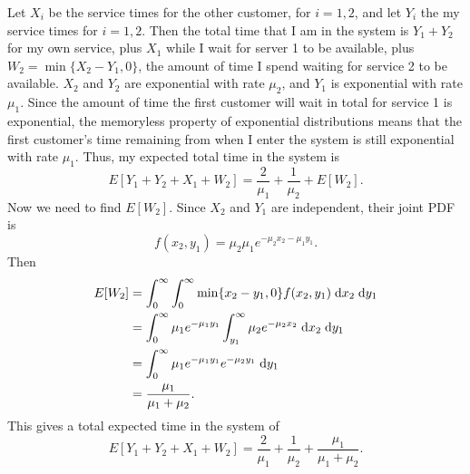 \documentclass{homework}
\begin{document}
	Let $X_i$ be the service times for the other customer, for $i=1,2$, and let $Y_i$ the my service times for $i=1,2$. Then the total time that I am in the system is $Y_1 + Y_2$ for my own service, plus $X_1$ while I wait for server 1 to be available, plus $W_2 = \min\{X_2 - Y_1, 0\}$, the amount of time I spend waiting for service 2 to be available. $X_2$ and $Y_2$ are exponential with rate $\mu_2$, and $Y_1$ is exponential with rate $\mu_1$. Since the amount of time the first customer will wait in total for service 1 is exponential, the memoryless property of exponential distributions means that the first customer's time remaining from when I enter the system is still exponential with rate $\mu_1$. Thus, my expected total time in the system is
	\begin{equation*}
		E[Y_1 + Y_2 + X_1 + W_2] = \frac{2}{\mu_1} + \frac{1}{\mu_2} + E[W_2].
	\end{equation*}
	Now we need to find $E[W_2]$. Since $X_2$ and $Y_1$ are independent, their joint PDF is
	\begin{equation*}
		f(x_2, y_1) = \mu_2\mu_1 e^{-\mu_2x_2-\mu_1y_1}.
	\end{equation*}
	Then
	\begin{align*}
		E[W_2] &= \int_0^\infty \int_0^\infty \min\{x_2 - y_1, 0\}f(x_2,y_1)\;\text{d} x_2 \;\text{d} y_1 \\
		&= \int_0^\infty \mu_1e^{-\mu_1y_1}\int_{y_1}^\infty \mu_2e^{-\mu_2x_2} \;\text{d} x_2 \;\text{d} y_1 \\
		&= \int_0^\infty \mu_1e^{-\mu_1y_1}e^{-\mu_2y_1}\;\text{d} y_1 \\
		&= \frac{\mu_1}{\mu_1 + \mu_2}.
	\end{align*}
	This gives a total expected time in the system of
	\begin{equation*}
		E[Y_1 + Y_2 + X_1 + W_2] = \frac{2}{\mu_1} + \frac{1}{\mu_2} + \frac{\mu_1}{\mu_1 + \mu_2}.
	\end{equation*}
	
\end{document}
